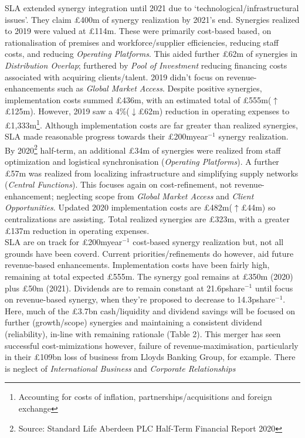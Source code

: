 \documentclass[11pt, english]{article}
\begin{document}
SLA extended synergy integration until 2021 due to `technological/infrastructural issues'. They claim \pounds400m of synergy realization by 2021's end. Synergies realized to 2019 were valued at \pounds114m. These were primarily cost-based based, on rationalisation of premises and workforce/supplier efficiencies, reducing staff costs, and reducing \textit{Operating Platforms}. This aided further \pounds62m of synergies in \textit{Distribution Overlap}; furthered by \textit{Pool of Investment} reducing financing costs associated with acquiring clients/talent. 2019 didn't focus on revenue-enhancements such as \textit{Global Market Access}. Despite positive synergies, implementation costs summed \pounds436m, with an estimated total of \pounds555m($\uparrow$\pounds125m). However, 2019 saw a 4\%($\downarrow$\pounds62m) reduction in operating expenses to \pounds1,333m\footnote{Accounting for costs of inflation, partnerships/acquisitions and foreign exchange}. Although implementation costs are far greater than realized synergies, SLA made reasonable progress towards their \pounds200myear$^{-1}$ synergy realization.\\

By 2020\footnote{Source: Standard Life Aberdeen PLC Half-Term Financial Report 2020} half-term, an additional \pounds34m of synergies were realized from staff optimization and logistical synchronisation (\textit{Operating Platforms}). A further \pounds57m was realized from localizing infrastructure and simplifying supply networks (\textit{Central Functions}). This focuses again on cost-refinement, not revenue-enhancement; neglecting scope from \textit{Global Market Access} and \textit{Client Opportunities}. Updated 2020 implementation costs are \pounds482m($\uparrow$\pounds44m) so centralizations are assisting. Total realized synergies are \pounds323m, with a greater \pounds137m reduction in operating expenses.\\

SLA are on track for \pounds200myear$^{-1}$ cost-based synergy realization but, not all grounds have been coverd. Current priorities/refinements do however, aid future revenue-based enhancements. Implementation costs have been fairly high, remaining at total expected \pounds555m. The synergy goal remains at \pounds350m (2020) plus \pounds50m (2021). Dividends are to remain constant at 21.6pshare$^{-1}$ until focus on revenue-based synergy, when they're proposed to decrease to 14.3pshare$^{-1}$. Here, much of the \pounds3.7bn cash/liquidity and dividend savings will be focused on further (growth/scope) synergies and maintaining a consistent dividend (reliability), in-line with remaining rationale (Table 2). This merger has seen successful cost-mimizations however, failure of revenue-maximisation, particularly in their \pounds109bn loss of business from Lloyds Banking Group, for example. There is neglect of \textit{International Business} and \textit{Corporate Relationships}
\end{document}

